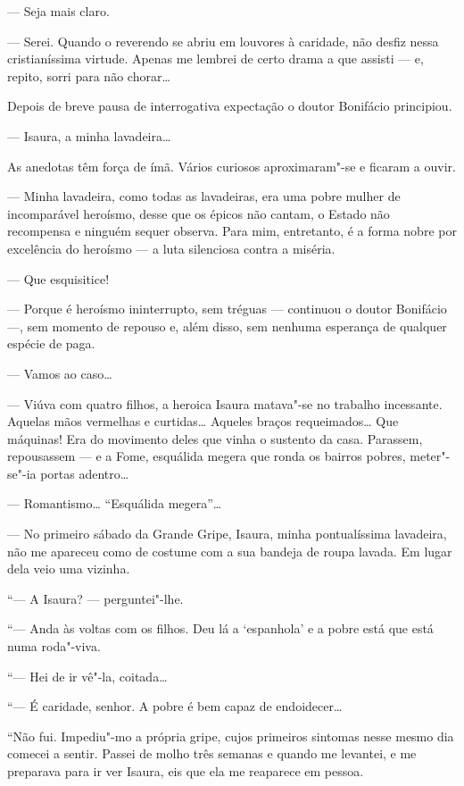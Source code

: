 --- Seja mais claro.

--- Serei. Quando o reverendo se abriu em louvores à caridade, não
desfiz nessa cristianíssima virtude. Apenas me lembrei de certo drama a
que assisti --- e, repito, sorri para não chorar\ldots{}

Depois de breve pausa de interrogativa expectação o doutor Bonifácio
principiou.

--- Isaura, a minha lavadeira\ldots{}

As anedotas têm força de ímã. Vários curiosos aproximaram"-se e ficaram a
ouvir.

--- Minha lavadeira, como todas as lavadeiras, era uma pobre mulher de
incomparável heroísmo, desse que os épicos não cantam, o Estado não
recompensa e ninguém sequer observa. Para mim, entretanto, é a forma
nobre por excelência do heroísmo --- a luta silenciosa contra a miséria.

--- Que esquisitice!

--- Porque é heroísmo ininterrupto, sem tréguas --- continuou o doutor
Bonifácio ---, sem momento de repouso e, além disso, sem nenhuma
esperança de qualquer espécie de paga.

--- Vamos ao caso\ldots{}

--- Viúva com quatro filhos, a heroica Isaura matava"-se no trabalho
incessante. Aquelas mãos vermelhas e curtidas\ldots{} Aqueles braços
requeimados\ldots{} Que máquinas! Era do movimento deles que vinha o sustento
da casa. Parassem, repousassem --- e a Fome, esquálida megera que ronda
os bairros pobres, meter"-se"-ia portas adentro\ldots{}

--- Romantismo\ldots{} ``Esquálida megera''\ldots{}

--- No primeiro sábado da Grande Gripe, Isaura, minha pontualíssima
lavadeira, não me apareceu como de costume com a sua bandeja de roupa
lavada. Em lugar dela veio uma vizinha.

``--- A Isaura? --- perguntei"-lhe.

``--- Anda às voltas com os filhos. Deu lá a `espanhola' e a pobre está
que está numa roda"-viva.

``--- Hei de ir vê"-la, coitada\ldots{}

``--- É caridade, senhor. A pobre é bem capaz de endoidecer\ldots{}

``Não fui. Impediu"-mo a própria gripe, cujos primeiros sintomas nesse
mesmo dia comecei a sentir. Passei de molho três semanas e quando me
levantei, e me preparava para ir ver Isaura, eis que ela me reaparece em
pessoa.


